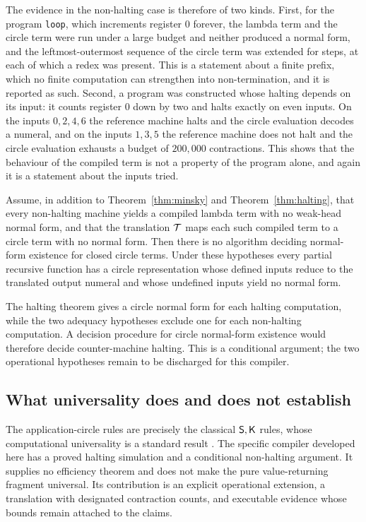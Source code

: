 The evidence in the non-halting case is therefore of two kinds. First, for the program \texttt{loop}, which increments register $0$ forever, the lambda term and the circle term were run under a large budget and neither produced a normal form, and the leftmost-outermost sequence of the circle term was extended for \factDivergencePrefix{} steps, at each of which a redex was present. This is a statement about a finite prefix, which no finite computation can strengthen into non-termination, and it is reported as such. Second, a program was constructed whose halting depends on its input: it counts register $0$ down by two and halts exactly on even inputs. On the inputs $0,2,4,6$ the reference machine halts and the circle evaluation decodes a numeral, and on the inputs $1,3,5$ the reference machine does not halt and the circle evaluation exhausts a budget of $200{,}000$ contractions. This shows that the behaviour of the compiled term is not a property of the program alone, and again it is a statement about the inputs tried.

\begin{corollary}\label{cor:undec}
Assume, in addition to Theorem~\ref{thm:minsky} and Theorem~\ref{thm:halting}, that every non-halting machine yields a compiled lambda term with no weak-head normal form, and that the translation $\mathcal{T}$ maps each such compiled term to a circle term with no normal form. Then there is no algorithm deciding normal-form existence for closed circle terms. Under these hypotheses every partial recursive function has a circle representation whose defined inputs reduce to the translated output numeral and whose undefined inputs yield no normal form.
\end{corollary}

The halting theorem gives a circle normal form for each halting computation, while the two adequacy hypotheses exclude one for each non-halting computation. A decision procedure for circle normal-form existence would therefore decide counter-machine halting. This is a conditional argument; the two operational hypotheses remain to be discharged for this compiler.

\subsection{What universality does and does not establish}

The application-circle rules are precisely the classical $\mathsf{S},\mathsf{K}$ rules, whose computational universality is a standard result \cite{curry-feys,hindley-seldin}. The specific compiler developed here has a proved halting simulation and a conditional non-halting argument. It supplies no efficiency theorem and does not make the pure value-returning fragment universal. Its contribution is an explicit operational extension, a translation with designated contraction counts, and executable evidence whose bounds remain attached to the claims.
